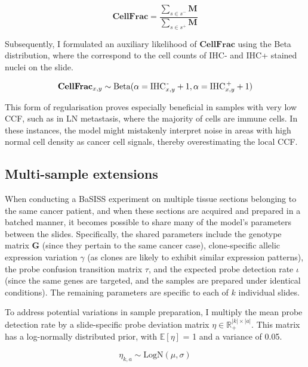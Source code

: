 \begin{equation} 
\mathbf{CellFrac} = \dfrac{\sum_{s \in s^-} \mathbf{M}}{\sum_{s \in s^+} \mathbf{M}}
\end{equation}

Subsequently, I formulated an auxiliary likelihood of $\mathbf{CellFrac}$ using the Beta distribution, where the  correspond to the cell counts of \ac{IHC}- and \ac{IHC}+ stained nuclei on the slide.

\begin{equation} 
\mathbf{CellFrac}_{x,y} \sim \mathrm{Beta}(\alpha=\text{IHC}^\text{\,-}_{x,y} + 1, \alpha=\text{IHC}^\text{\,+}_{x,y} + 1)
\end{equation}

This form of regularisation proves especially beneficial in samples with very low \acl{CCF}, such as in \acl{LN} metastasis, where the majority of cells are immune cells. In these instances, the model might mistakenly interpret noise in areas with high normal cell density as cancer cell signals, thereby overestimating the local \ac{CCF}.

\subsection{Multi-sample extensions}
When conducting a BaSISS experiment on multiple tissue sections belonging to the same cancer patient, and when these sections are acquired and prepared in a batched manner, it becomes possible to share many of the model's parameters between the slides. Specifically, the shared parameters include the genotype matrix $\mathbf{G}$ (since they pertain to the same cancer case), clone-specific allelic expression variation $\gamma$ (as clones are likely to exhibit similar expression patterns), the probe confusion transition matrix $\tau$, and the expected probe detection rate $\iota$ (since the same genes are targeted, and the samples are prepared under identical conditions). The remaining parameters are specific to each of $k$ individual slides.

To address potential variations in sample preparation, I multiply the mean probe detection rate by a slide-specific probe deviation matrix $\eta \in \mathbb{R}_{+}^{|k|\times|a|}$. This matrix has a log-normally distributed prior, with $\mathbb{E}[{\eta}]$ = 1 and a variance of 0.05.

\begin{equation} 
\eta_{k,a} \sim \text{LogN}(\mu, \sigma)
\end{equation}

